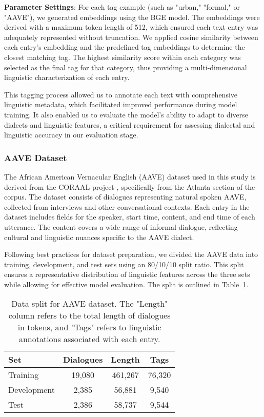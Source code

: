 \textbf{Parameter Settings}: For each tag example (such as "urban," "formal," or "AAVE"), we generated embeddings using the BGE model. The embeddings were derived with a maximum token length of 512, which ensured each text entry was adequately represented without truncation. We applied cosine similarity between each entry’s embedding and the predefined tag embeddings to determine the closest matching tag. The highest similarity score within each category was selected as the final tag for that category, thus providing a multi-dimensional linguistic characterization of each entry.

This tagging process allowed us to annotate each text with comprehensive linguistic metadata, which facilitated improved performance during model training. It also enabled us to evaluate the model’s ability to adapt to diverse dialects and linguistic features, a critical requirement for assessing dialectal and linguistic accuracy in our evaluation stage.


\subsubsection{AAVE Dataset}
The African American Vernacular English (AAVE) dataset used in this study is derived from the CORAAL project \cite{kendall23}, specifically from the Atlanta section of the corpus. The dataset consists of dialogues representing natural spoken AAVE, collected from interviews and other conversational contexts. Each entry in the dataset includes fields for the speaker, start time, content, and end time of each utterance. The content covers a wide range of informal dialogue, reflecting cultural and linguistic nuances specific to the AAVE dialect.

Following best practices for dataset preparation, we divided the AAVE data into training, development, and test sets using an 80/10/10 split ratio. This split ensures a representative distribution of linguistic features across the three sets while allowing for effective model evaluation. The split is outlined in Table~\ref{table:aave-split}.

\begin{table}[h]
    \centering
    \begin{tabular}{|l|c|c|c|}
        \hline
        \textbf{Set} & \textbf{Dialogues} & \textbf{Length} & \textbf{Tags} \\
        \hline
        Training & 19,080 & 461,267 & 76,320 \\
        Development & 2,385 & 56,881 & 9,540 \\
        Test & 2,386 & 58,737 & 9,544 \\
        \hline
    \end{tabular}
    \caption{Data split for AAVE dataset. The "Length" column refers to the total length of dialogues in tokens, and "Tags" refers to linguistic annotations associated with each entry.}
    \label{table:aave-split}
\end{table}

